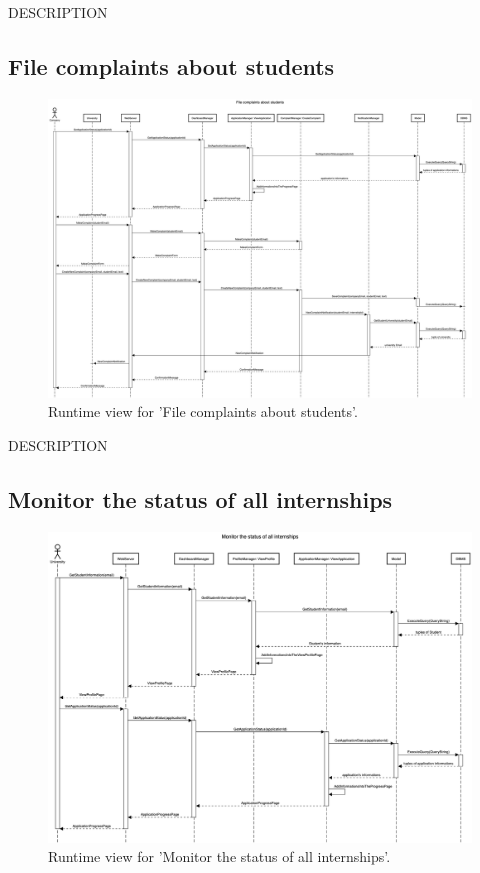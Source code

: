 DESCRIPTION


\subsection{File complaints about students}
\begin{figure}[H]
    \begin{center}
        \includegraphics[width=0.8\linewidth]{DD/LaTeX/Images/RuntimeView/FileComplaintsAboutStudents.png}
        \caption{Runtime view for 'File complaints about students'.}
        \label{fig:runtime_FileComplaintsAboutStudents}%
    \end{center}
\end{figure}

DESCRIPTION


\subsection{Monitor the status of all internships}
\begin{figure}[H]
    \begin{center}
        \includegraphics[width=0.8\linewidth]{DD/LaTeX/Images/RuntimeView/MonitorStatusOfAllInternships.png}
        \caption{Runtime view for 'Monitor the status of all internships'.}
        \label{fig:runtime_MonitorStatusOfAllInternships}%
    \end{center}
\end{figure}

